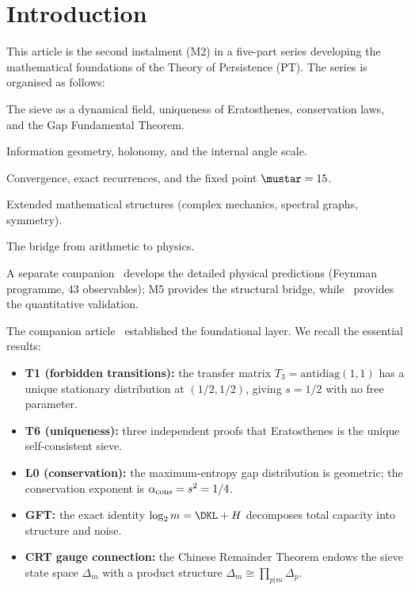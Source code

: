\documentclass[12pt,a4paper]{article}
\begin{document}
\section{Introduction}
\label{sec:intro}

This article is the second instalment (M2) in a five-part series
developing the mathematical foundations of the Theory of Persistence
(PT).  The series is organised as follows:
\begin{description}[nosep]
\item[M1~\cite{companion_M1}:] The sieve as a dynamical field,
  uniqueness of Eratosthenes, conservation laws, and the Gap
  Fundamental Theorem.
\item[M2 (this article):] Information geometry, holonomy, and the
  internal angle scale.
\item[M3~\cite{companion_M3}:] Convergence, exact recurrences, and
  the fixed point $\mustar = 15$.
\item[M4~\cite{companion_M4}:] Extended mathematical structures
  (complex mechanics, spectral graphs, symmetry).
\item[M5~\cite{companion_M5}:] The bridge from arithmetic to physics.
\end{description}
\noindent
A separate companion~\cite{companion_physics} develops the detailed
physical predictions (Feynman programme, 43 observables);
M5 provides the structural bridge, while~\cite{companion_physics}
provides the quantitative validation.

The companion article~\cite{companion_M1} established the foundational
layer.  We recall the essential results:
\begin{itemize}[nosep]
\item \textbf{T1 (forbidden transitions):} the transfer matrix
  $T_3 = \mathrm{antidiag}(1,1)$ has a unique stationary distribution
  at $(1/2, 1/2)$, giving $s = 1/2$ with no free parameter.
\item \textbf{T6 (uniqueness):} three independent proofs that
  Eratosthenes is the unique self-consistent sieve.
\item \textbf{L0 (conservation):} the maximum-entropy gap distribution
  is geometric; the conservation exponent is $\alpha_{\rm cons} = s^2
  = 1/4$.
\item \textbf{GFT:} the exact identity $\log_2 m = \DKL + H$
  decomposes total capacity into structure and noise.
\item \textbf{CRT gauge connection:} the Chinese Remainder Theorem
  endows the sieve state space $\Delta_m$ with a product structure
  $\Delta_m \cong \prod_{p|m} \Delta_p$.
\end{itemize}
\end{document}
